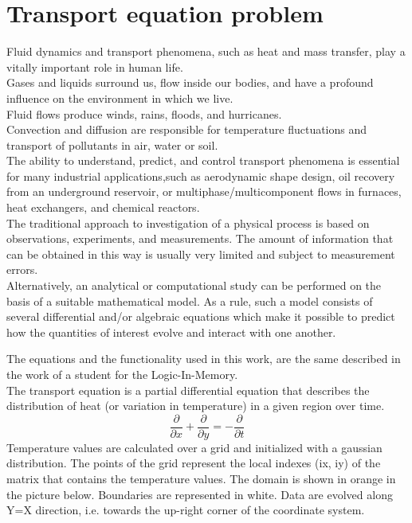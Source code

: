 \chapter{Transport equation problem}
Fluid dynamics and transport phenomena, such as heat and mass transfer, play a vitally important role in human life.\\
Gases and liquids surround us, flow inside our bodies, and have a profound influence on the environment in which we live.\\
 Fluid flows produce winds, rains, floods, and hurricanes.\\ Convection and diffusion are responsible for temperature fluctuations and transport of pollutants in air, water or soil.\\
The ability to understand, predict, and control transport phenomena is essential for many industrial applications,such as aerodynamic shape design, oil recovery from an underground reservoir, or multiphase/multicomponent flows in furnaces, heat exchangers, and chemical reactors.\\
The traditional approach to investigation of a physical process is based on observations, experiments, and measurements. The amount of information that can be obtained in this way is usually very limited and subject to measurement errors.\\
Alternatively, an analytical or computational study can be performed on the basis of a suitable mathematical model. As a rule, such a model consists of several differential and/or algebraic equations which make it possible to predict how the quantities of interest evolve and interact with one another.\\
\bigskip

The equations and the functionality used in this work, are the same described in the work of a student for the Logic-In-Memory. \\
The transport equation is a partial differential equation that describes the distribution of heat (or variation in temperature) in a given region over time.
\begin{equation}
	\dfrac{\partial}{\partial x} + \dfrac{\partial}{\partial y} = -\dfrac{\partial}{\partial t}
\end{equation}
Temperature values are calculated over a grid and initialized with a gaussian distribution. The points of the grid represent the local indexes (ix, iy) of the matrix that contains the temperature values. The domain is shown in orange in the picture below. Boundaries are represented in white. Data are evolved along Y=X direction, i.e. towards the up-right corner of the coordinate system.

